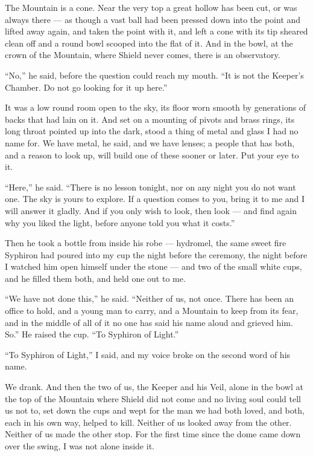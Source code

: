 The Mountain is a cone. Near the very top a great hollow has been cut, or was always there --- as though a vast ball had been pressed down into the point and lifted away again, and taken the point with it, and left a cone with its tip sheared clean off and a round bowl scooped into the flat of it. And in the bowl, at the crown of the Mountain, where Shield never comes, there is an observatory.\par

``No,'' he said, before the question could reach my mouth. ``It is not the Keeper's Chamber. Do not go looking for it up here.''\par

It was a low round room open to the sky, its floor worn smooth by generations of backs that had lain on it. And set on a mounting of pivots and brass rings, its long throat pointed up into the dark, stood a thing of metal and glass I had no name for. We have metal, he said, and we have lenses; a people that has both, and a reason to look up, will build one of these sooner or later. Put your eye to it.\par

``Here,'' he said. ``There is no lesson tonight, nor on any night you do not want one. The sky is yours to explore. If a question comes to you, bring it to me and I will answer it gladly. And if you only wish to look, then look --- and find again why you liked the light, before anyone told you what it costs.''\par

Then he took a bottle from inside his robe --- hydromel, the same sweet fire Syphiron had poured into my cup the night before the ceremony, the night before I watched him open himself under the stone --- and two of the small white cups, and he filled them both, and held one out to me.\par

``We have not done this,'' he said. ``Neither of us, not once. There has been an office to hold, and a young man to carry, and a Mountain to keep from its fear, and in the middle of all of it no one has said his name aloud and grieved him. So.'' He raised the cup. ``To Syphiron of Light.''\par

``To Syphiron of Light,'' I said, and my voice broke on the second word of his name.\par

We drank. And then the two of us, the Keeper and his Veil, alone in the bowl at the top of the Mountain where Shield did not come and no living soul could tell us not to, set down the cups and wept for the man we had both loved, and both, each in his own way, helped to kill. Neither of us looked away from the other. Neither of us made the other stop. For the first time since the dome came down over the swing, I was not alone inside it.\par


